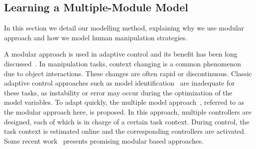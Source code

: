 \subsection{Learning a Multiple-Module Model}
\label{cha4:sec2:learn}
In this section we detail our modelling method, explaining why we use modular approach and how we model human manipulation strategies.


A modular approach is used in adaptive control and its benefit has been long discussed~\cite{jacobs1991adaptive,narendra1997adaptive}.
In manipulation tasks, context changing is a common phenomenon due to object interactions. These changes are often rapid or discontinuous. Classic adaptive control approaches such as model identification~\cite{khalil2004modeling} are inadequate for these tasks, as instability or error may occur during the optimization of the model variables. To adapt quickly, the multiple model approach~\cite{narendra1995adaptation}, referred to as the modular approach here, is proposed. In this approach, multiple controllers are designed, each of which is in charge of a certain task context. During control, the task context is estimated online and the corresponding controllers are activated.  Some recent work~\cite{fekri2007robust,kuipers2010multiple,sugimoto2012emosaic} presents promising modular based approaches.



